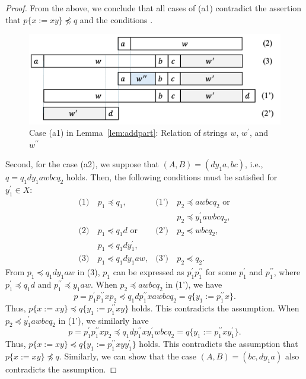 \begin{proof}
  From the above, we conclude that all cases of (a1) contradict the assertion that $p\{x := xy\} \not\preceq q$ and the conditions \TheConditionA.
  
  \begin{figure}[t]
    \begin{center}
      \includegraphics[scale=0.345]{figs/centerproof1.pdf}
      \caption{Case (a1) in Lemma~\ref{lem:addpart}: Relation of strings $w$, $w^{\prime}$, and $w^{\prime\prime}$}\label{fig:centerproof1}
    \end{center}
    \end{figure}

  Second, for the case (a2), we suppose that $(A, B) = (dy_{1}a, bc)$, i.e., $q = q_{1}dy_{1}awbcq_{2} $ holds.
  Then, the following conditions must be satisfied for $y_{1}^{\prime}\in X$:
  \begin{align*}
    \textrm{(1)}~& p_{1} \preceq q_{1}, & \textrm{(1')}~& p_{2} \preceq awbcq_{2}\mbox{ or} \\
    & & & p_{2} \preceq y_{1}^{\prime}awbcq_{2},\\
    \textrm{(2)}~& p_{1} \preceq q_{1}d\mbox{ or}  & \textrm{(2')}~& p_{2} \preceq wbcq_{2}, \\
    & p_{1} \preceq q_{1}dy_{1}^{\prime}, & & \\
    \textrm{(3)}~& p_{1} \preceq q_{1}dy_{1}aw, & \textrm{(3')}~& p_{2} \preceq q_{2}.
  \end{align*}
  From $p_{1} \preceq q_{1}dy_{1}aw$ in (3), $p_{1}$ can be expressed as $p^{\prime}_{1}p^{\prime\prime}_{1}$ for some $p^{\prime}_{1}$ and $p^{\prime\prime}_{1}$, where $p^{\prime}_{1} \preceq q_{1}d$ and $p^{\prime\prime}_{1} \preceq y_{1}aw$.
  When $p_{2} \preceq awbcq_{2}$ in (1'), we have
  $$p=p^{\prime}_{1}p^{\prime\prime}_{1}xp_{2} \preceq q_{1}dp^{\prime\prime}_{1}xawbcq_{2}=q \{ y_{1}:=p^{\prime\prime}_{1}x \}.$$
  Thus, $p \{ x := xy \} \preceq q \{ y_{1}:=p^{\prime\prime}_{1}xy \}$ holds.
  This contradicts the assumption.
  When $p_{2} \preceq y_{1}^{\prime}awbcq_{2}$ in (1'), we similarly have
  $$p=p^{\prime}_{1}p^{\prime\prime}_{1}xp_{2} \preceq q_{1}dp^{\prime\prime}_{1}xy_{1}^{\prime}wbcq_{2}=q \{ y_{1}:=p^{\prime\prime}_{1}xy_{1}^{\prime} \}.$$
  Thus, $p \{ x := xy \} \preceq q \{ y_{1}:=p^{\prime\prime}_{1}xyy_{1}^{\prime} \}$ holds.
  This contradicts the assumption that $p \{ x := xy \} \not\preceq q$.
  Similarly, we can show that the case $(A, B) = (bc, dy_{1}a)$ also contradicts the assumption.
  

\end{proof}
